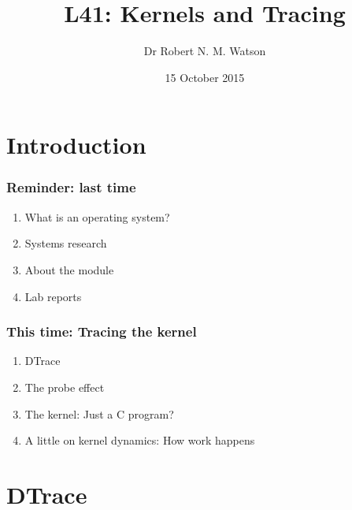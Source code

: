 
{
}

\usepackage[english]{babel}
\usepackage[latin1]{inputenc}
\usepackage{graphicx}
\usepackage{times}
\usepackage[T1]{fontenc}
\usepackage{fancyvrb}
\usepackage{hyperref}
\usepackage{listings}


\title{L41: Kernels and Tracing}
\author{Dr Robert N. M. Watson}
\date{15 October 2015}

\begin{frame}
  \titlepage
\end{frame}

\section{Introduction}

\begin{frame}
  \frametitle{Reminder: last time}

  \begin{enumerate}
    \item What is an operating system?
    \item Systems research
    \item About the module
    \item Lab reports
  \end{enumerate}
\end{frame}

\begin{frame}
  \frametitle{This time: Tracing the kernel}

  \begin{enumerate}
    \item DTrace
    \item The probe effect
    \item The kernel: Just a C program?
    \item A little on kernel dynamics: How work happens
  \end{enumerate}
\end{frame}

\section{DTrace}

